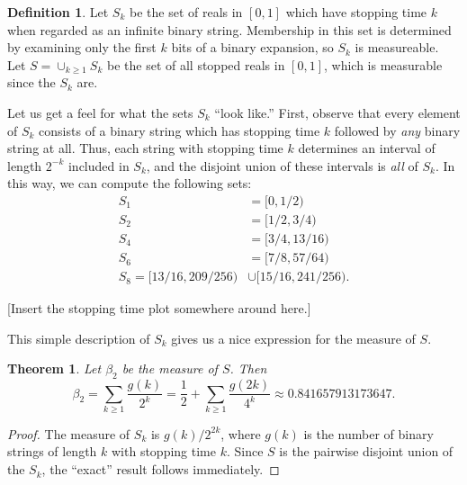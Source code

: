 \documentclass[12pt]{amsart}
\newtheorem{theorem}{Theorem}
\theoremstyle{definition}
\newtheorem{definition}{Definition}
\begin{document}
\begin{definition}
    Let $S_k$ be the set of reals in $[0, 1]$ which have stopping time $k$ when
    regarded as an infinite binary string. Membership in this set is determined
    by examining only the first $k$ bits of a binary expansion, so $S_k$ is
    measureable. Let $S = \cup_{k \geq 1} S_k$ be the set of all stopped reals
    in $[0, 1]$, which is measurable since the $S_k$ are.
\end{definition}

Let us get a feel for what the sets $S_k$ ``look like.'' First, observe that
every element of $S_k$ consists of a binary string which has stopping time $k$
followed by \emph{any} binary string at all. Thus, each string with stopping
time $k$ determines an interval of length $2^{-k}$ included in $S_k$, and the
disjoint union of these intervals is \emph{all} of $S_k$. In this way, we can
compute the following sets:
\begin{align*}
    S_1 &= [0, 1/2) \\
    S_2 &= [1/2, 3/4) \\
    S_4 &= [3/4, 13/16) \\
    S_6 &= [7/8, 57/64) \\
    S_8 = [13/16, 209/256) &\cup [15/16, 241/256).
\end{align*}

[Insert the stopping time plot somewhere around here.]

This simple description of $S_k$ gives us a nice expression for the measure of
$S$.

\begin{theorem}
    Let $\beta_2$ be the measure of $S$. Then
    \begin{equation*}
        \beta_2 = \sum_{k \geq 1} \frac{g(k)}{2^k} = \frac{1}{2} + \sum_{k \geq 1} \frac{g(2k)}{4^k}
        \approx 0.841657913173647.
    \end{equation*}
\end{theorem}

\begin{proof}
    The measure of $S_k$ is $g(k) / 2^{2k}$, where $g(k)$ is the number of
    binary strings of length $k$ with stopping time $k$. Since $S$ is the
    pairwise disjoint union of the $S_k$, the ``exact'' result follows
    immediately.
\end{proof}
\end{document}
